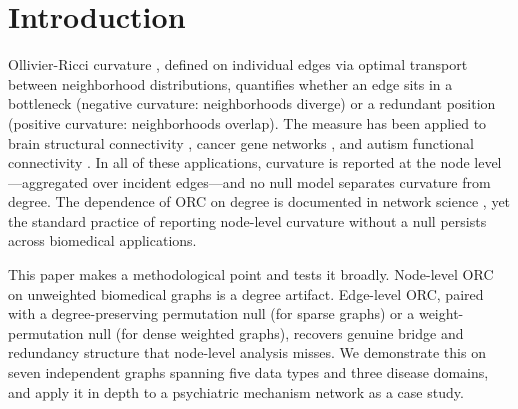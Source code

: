 \documentclass[11pt]{article}
\begin{document}
\section{Introduction}

Ollivier-Ricci curvature \citep{ollivier2009ricci}, defined on individual edges via optimal transport between neighborhood distributions, quantifies whether an edge sits in a bottleneck (negative curvature: neighborhoods diverge) or a redundant position (positive curvature: neighborhoods overlap). The measure has been applied to brain structural connectivity \citep{farooq2019network}, cancer gene networks \citep{sandhu2015graph}, and autism functional connectivity \citep{simhal2020measuring, elumalai2022graph}. In all of these applications, curvature is reported at the node level---aggregated over incident edges---and no null model separates curvature from degree. The dependence of ORC on degree is documented in network science \citep{ni2015ricci}, yet the standard practice of reporting node-level curvature without a null persists across biomedical applications.

This paper makes a methodological point and tests it broadly. Node-level ORC on unweighted biomedical graphs is a degree artifact. Edge-level ORC, paired with a degree-preserving permutation null (for sparse graphs) or a weight-permutation null (for dense weighted graphs), recovers genuine bridge and redundancy structure that node-level analysis misses. We demonstrate this on seven independent graphs spanning five data types and three disease domains, and apply it in depth to a psychiatric mechanism network as a case study.
\end{document}
